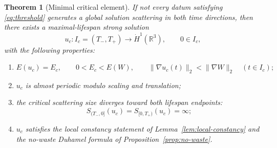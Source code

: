 \documentclass{interact}
\numberwithin{equation}{section}
\theoremstyle{plain}
\newtheorem{theorem}{Theorem}[section]
\theoremstyle{definition}
\theoremstyle{remark}
\newcommand{\R}{\mathbb R}
\begin{document}
\begin{theorem}[Minimal critical element]\label{thm:minimal-element}
If not every datum satisfying \eqref{eq:threshold} generates a global solution scattering in both time directions, then there exists a maximal-lifespan strong solution
\[
 u_c:I_c=(T_-,T_+)\longrightarrow\dot H^1(\R^3),
 \qquad 0\in I_c,
\]
with the following properties:
\begin{enumerate}[label=\textup{(\roman*)},leftmargin=2.4em]
 \item
 \begin{equation}\label{eq:minimal-energy-and-branch}
  E(u_c)=E_c,
  \qquad
  0<E_c<E(W),
  \qquad
  \|\nabla u_c(t)\|_2<\|\nabla W\|_2
  \quad(t\in I_c);
 \end{equation}
 \item $u_c$ is almost periodic modulo scaling and translation;
 \item the critical scattering size diverges toward both lifespan endpoints:
 \[
  S_{(T_-,0]}(u_c)
  =S_{[0,T_+)}(u_c)
  =\infty;
 \]
 \item $u_c$ satisfies the local constancy statement of Lemma~\ref{lem:local-constancy} and the no-waste Duhamel formula of Proposition~\ref{prop:no-waste}.
\end{enumerate}
\end{theorem}
\end{document}
